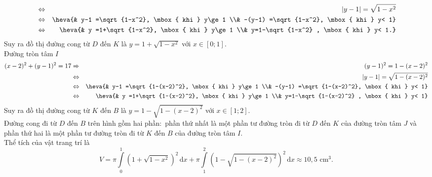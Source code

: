 \begin{ex}
{\begin{eqnarray*}
	& \Leftrightarrow& |y-1|=\sqrt{1-x^2}\\
	& \Leftrightarrow &\heva{& y-1 =\sqrt{1-x^2}, \mbox{ khi } y\ge 1 \\& -(y-1) =\sqrt{1-x^2}, \mbox{ khi } y< 1} \\
	&\Leftrightarrow& \heva{& y =1+\sqrt{1-x^2}, \mbox{ khi } y\ge 1 \\& y=1-\sqrt{1-x^2} , \mbox{ khi } y< 1.}
	\end{eqnarray*}	
	Suy ra đồ thị đường cong từ $D$ đến $K$ là $y=1+\sqrt{1-x^2}$ với $x\in [0;1]$.\\	
	Đường tròn tâm $I$
	\begin{eqnarray*}
	(x-2)^2+(y-1)^2=17&\Rightarrow& (y-1)^2=1-(x-2)^2 \\
	&\Leftrightarrow& |y-1|=\sqrt{1-(x-2)^2}\\
	&\Leftrightarrow& \heva{& y-1 =\sqrt{1-(x-2)^2}, \mbox{ khi } y\ge 1 \\& -(y-1) =\sqrt{1-(x-2)^2}, \mbox{ khi } y< 1}\\
	&\Leftrightarrow& \heva{& y =1+\sqrt{1-(x-2)^2}, \mbox{ khi } y\ge 1 \\& y=1-\sqrt{1-(x-2)^2} , \mbox{ khi } y< 1}
	\end{eqnarray*}
	Suy ra đồ thị đường cong từ $K$ đến $B$ là $y=1-\sqrt{1-(x-2)^2}$ với $x\in [1;2]$.\\	
	Đường cong đi từ $D$ đến $B$ trên hình gồm hai phần$\colon$ phần thứ nhất là một phần tư đường tròn đi từ $D$ đến $K$ của đường tròn tâm $J$ và phần thứ hai là một phần tư đường tròn đi từ $K$ đến $B$ của đường tròn tâm $I$.\\
	Thể tích của vật trang trí là
	$$V= \pi\displaystyle\int\limits_0^1 \left(1+\sqrt{1-x^2}\right)^2\mathrm{\,d}x + \pi\displaystyle\int\limits_1^2 \left(1-\sqrt{1-(x-2)^2}\right)^2\mathrm{\,d}x \approx 10{,}5 \mbox{ cm}^3.$$
	}
\end{ex}
